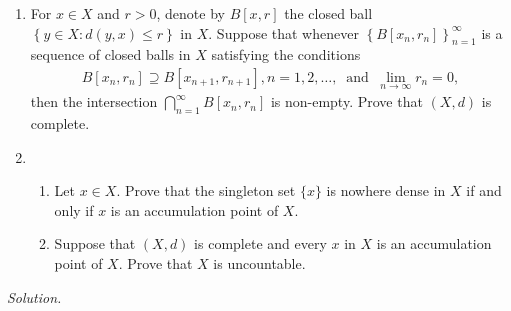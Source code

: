 \documentclass[11pt]{amsart}
\theoremstyle{plain}
\numberwithin{equation}{section}
\begin{document}
\begin{enumerate}[label=\textbf{(\alph*)}]
    \itemsep 0em
    \item For $x\in X$ and $r>0$, denote by $B[x,r]$ the closed ball $\left\{y\in X:d(y,x)\leq r\right\}$ in $X$. Suppose that whenever $\left\{B\left[x_{n},r_{n}\right]\right\}_{n=1}^{\infty}$ is a sequence of closed balls in $X$ satisfying the conditions
\begin{align*}
    B\left[x_{n},r_{n}\right]\supseteq B\left[x_{n+1},r_{n+1}\right],n=1,2,\dots,~\text{ and }~\lim_{n\to\infty}r_{n}=0,
\end{align*}
then the intersection $\bigcap_{n=1}^{\infty}B\left[x_{n},r_{n}\right]$ is non-empty. Prove that $(X,d)$ is complete.
\item \begin{enumerate}[label=\textbf{(\roman*)}]
    \itemsep 0em
    \item Let $x\in X$. Prove that the singleton set $\{x\}$ is nowhere dense in $X$ if and only if $x$ is an accumulation point of $X$.
    \item Suppose that $(X,d)$ is complete and every $x$ in $X$ is an accumulation point of $X$. Prove that $X$ is uncountable.
\end{enumerate}
\end{enumerate}
\noindent\emph{Solution.}
\end{document}

